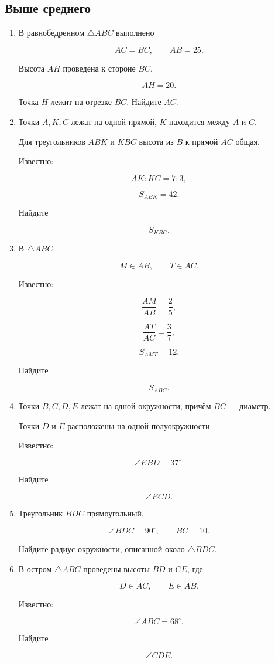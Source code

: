 \documentclass[a4paper,12pt]{article}
\begin{document}
\subsection{Выше среднего}

\begin{enumerate}[label=\textbf{\arabic*.},resume]

  \item
  В равнобедренном $\triangle ABC$ выполнено

  \[
  AC=BC,
  \qquad
  AB=25.
  \]

  Высота $AH$ проведена к стороне $BC$,

  \[
  AH=20.
  \]

  Точка $H$ лежит на отрезке $BC$.
  Найдите $AC$.

  \item
  Точки $A,K,C$ лежат на одной прямой,
  $K$ находится между $A$ и $C$.

  Для треугольников $ABK$ и $KBC$
  высота из $B$ к прямой $AC$ общая.

  Известно:

  \[
  AK:KC=7:3,
  \]

  \[
  S_{ABK}=42.
  \]

  Найдите

  \[
  S_{KBC}.
  \]

  \item
  В $\triangle ABC$

  \[
  M\in AB,
  \qquad
  T\in AC.
  \]

  Известно:

  \[
  \frac{AM}{AB}
  =
  \frac25,
  \]

  \[
  \frac{AT}{AC}
  =
  \frac37,
  \]

  \[
  S_{AMT}=12.
  \]

  Найдите

  \[
  S_{ABC}.
  \]

  \item
  Точки $B,C,D,E$
  лежат на одной окружности,
  причём $BC$ --- диаметр.

  Точки $D$ и $E$
  расположены на одной полуокружности.

  Известно:

  \[
  \angle EBD=37^\circ.
  \]

  Найдите

  \[
  \angle ECD.
  \]

  \item
  Треугольник $BDC$ прямоугольный,

  \[
  \angle BDC=90^\circ,
  \qquad
  BC=10.
  \]

  Найдите радиус окружности,
  описанной около $\triangle BDC$.

  \item
  В остром $\triangle ABC$
  проведены высоты $BD$ и $CE$,
  где

  \[
  D\in AC,
  \qquad
  E\in AB.
  \]

  Известно:

  \[
  \angle ABC=68^\circ.
  \]

  Найдите

  \[
  \angle CDE.
  \]

\end{enumerate}
\end{document}

